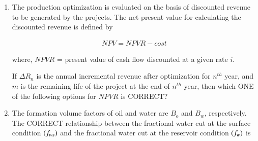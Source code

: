 \documentclass[journal,12pt,onecolumn]{IEEEtran}
\theoremstyle{remark}
\begin{document}
\begin{enumerate}
\hfill{}

\begin{enumerate}
\end{enumerate}

\item The production optimization is evaluated on the basis of discounted revenue to be generated by the projects. The net present value  for calculating the discounted revenue is defined by  

\begin{align*}
NPV = NPVR - cost
\end{align*}

where, $NPVR$ = present value of cash flow discounted at a given rate $i$.  

If $\Delta R_n$ is the annual incremental revenue after optimization for $n^{th}$ year, and $m$ is the remaining life of the project at the end of $n^{th}$ year, then which ONE of the following options for $NPVR$ is CORRECT?

\hfill{}

\begin{enumerate}
\end{enumerate}

\item The formation volume factors of oil and water are $B_o$ and $B_w$, respectively.  
The CORRECT relationship between the fractional water cut at the surface condition $\left(f_{ws}\right)$ and the fractional water cut at the reservoir condition $\left(f_w\right)$ is

\hfill{}


\end{enumerate}
\end{document}

